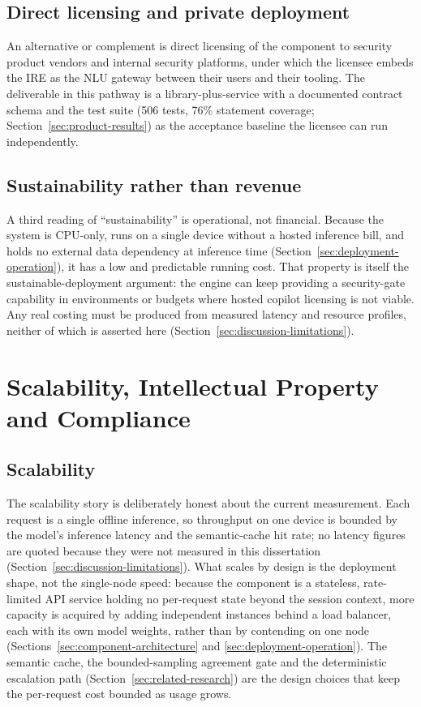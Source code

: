 \subsection*{Direct licensing and private deployment}

An alternative or complement is direct licensing of the component to security
product vendors and internal security platforms, under which the licensee embeds
the IRE as the NLU gateway between their users and their tooling. The
deliverable in this pathway is a library-plus-service with a documented contract
schema and the test suite (506 tests, 76\% statement coverage;
Section~\ref{sec:product-results}) as the acceptance baseline the licensee can
run independently.

\subsection*{Sustainability rather than revenue}

A third reading of ``sustainability'' is operational, not financial. Because the
system is CPU-only, runs on a single device without a hosted inference bill,
and holds no external data dependency at inference time
(Section~\ref{sec:deployment-operation}), it has a low and predictable running
cost. That property is itself the sustainable-deployment argument: the engine
can keep providing a security-gate capability in environments or budgets where
hosted copilot licensing is not viable. Any real costing must be produced from
measured latency and resource profiles, neither of which is asserted here
(Section~\ref{sec:discussion-limitations}).

\section{Scalability, Intellectual Property and Compliance}\label{sec:ip-compliance}

\subsection*{Scalability}

The scalability story is deliberately honest about the current measurement.
Each request is a single offline inference, so throughput on one device is
bounded by the model's inference latency and the semantic-cache hit rate; no
latency figures are quoted because they were not measured in this dissertation
(Section~\ref{sec:discussion-limitations}). What scales by design is the
deployment shape, not the single-node speed: because the component is a
stateless, rate-limited API service holding no per-request state beyond the
session context, more capacity is acquired by adding independent instances
behind a load balancer, each with its own model weights, rather than by
contending on one node (Sections~\ref{sec:component-architecture} and
\ref{sec:deployment-operation}). The semantic cache, the bounded-sampling
agreement gate and the deterministic escalation path
(Section~\ref{sec:related-research}) are the design choices that keep the
per-request cost bounded as usage grows.

